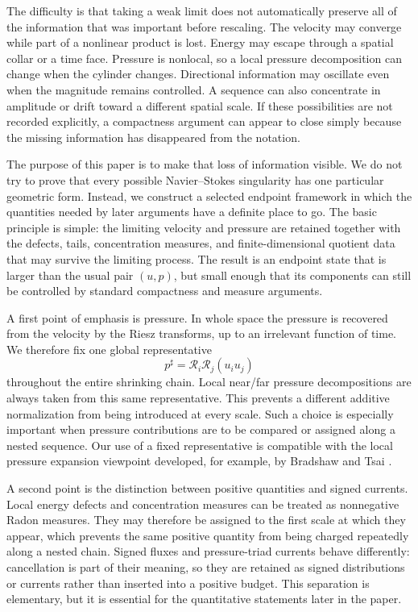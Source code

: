 \documentclass[11pt]{article}
\theoremstyle{definition}\newtheorem{problem}[theorem]{Problem}
\theoremstyle{definition}
\theoremstyle{remark}
\begin{document}
The difficulty is that taking a weak limit does not automatically preserve all
of the information that was important before rescaling.  The velocity may
converge while part of a nonlinear product is lost.  Energy may escape through
a spatial collar or a time face.  Pressure is nonlocal, so a local pressure
decomposition can change when the cylinder changes.  Directional information
may oscillate even when the magnitude remains controlled.  A sequence can also
concentrate in amplitude or drift toward a different spatial scale.  If these
possibilities are not recorded explicitly, a compactness argument can appear
to close simply because the missing information has disappeared from the
notation.

The purpose of this paper is to make that loss of information visible.  We do
not try to prove that every possible Navier--Stokes singularity has one
particular geometric form.  Instead, we construct a selected endpoint
framework in which the quantities needed by later arguments have a definite
place to go.  The basic principle is simple: the limiting velocity and pressure
are retained together with the defects, tails, concentration measures, and
finite-dimensional quotient data that may survive the limiting process.  The
result is an endpoint state that is larger than the usual pair \((u,p)\), but
small enough that its components can still be controlled by standard
compactness and measure arguments.

A first point of emphasis is pressure.  In whole space the pressure is
recovered from the velocity by the Riesz transforms, up to an irrelevant
function of time.  We therefore fix one global representative
\[
  p^\sharp=\mathcal R_i\mathcal R_j(u_i u_j)
\]
throughout the entire shrinking chain.  Local near/far pressure decompositions
are always taken from this same representative.  This prevents a different
additive normalization from being introduced at every scale.  Such a choice is
especially important when pressure contributions are to be compared or
assigned along a nested sequence.  Our use of a fixed representative is
compatible with the local pressure expansion viewpoint developed, for example,
by Bradshaw and Tsai \cite{BradshawTsai2022}.

A second point is the distinction between positive quantities and signed
currents.  Local energy defects and concentration measures can be treated as
nonnegative Radon measures.  They may therefore be assigned to the first scale
at which they appear, which prevents the same positive quantity from being
charged repeatedly along a nested chain.  Signed fluxes and pressure-triad
currents behave differently: cancellation is part of their meaning, so they
are retained as signed distributions or currents rather than inserted into a
positive budget.  This separation is elementary, but it is essential for the
quantitative statements later in the paper.
\end{document}
